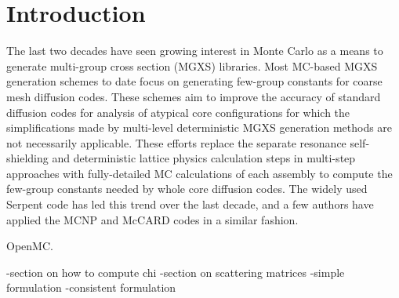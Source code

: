 \section{Introduction}
\label{sec:intro}

The last two decades have seen growing interest in Monte Carlo as a means to generate multi-group cross section (MGXS) libraries. Most MC-based MGXS generation schemes to date focus on generating few-group constants for coarse mesh diffusion codes. These schemes aim to improve the accuracy of standard diffusion codes for analysis of atypical core configurations for which the simplifications made by multi-level deterministic MGXS generation methods are not necessarily applicable. These efforts replace the separate resonance self-shielding and deterministic lattice physics calculation steps in multi-step approaches with fully-detailed MC calculations of each assembly to compute the few-group constants needed by whole core diffusion codes. The widely used Serpent code\cite{leppanen2007serpent} has led this trend over the last decade, and a few authors have applied the MCNP\cite{pounders2006stochastically} and McCARD\cite{shim2008generation} codes in a similar fashion.

OpenMC\cite{romano2015openmc}.

-section on how to compute chi
-section on scattering matrices
  -simple formulation
  -consistent formulation
